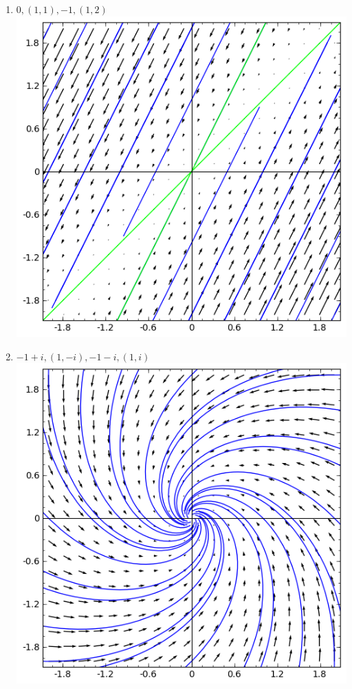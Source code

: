 {\begin{multicols}{2}
\begin{enumerate}
\begin{enumerate}
\item $0, (1,1),  -1, (1,2)$\\\includegraphics[width=\myvfwidth]{02-Applications/support/vfi}
\item $-1+i, (1,-i),  -1-i, (1,i)$\\\includegraphics[width=\myvfwidth]{02-Applications/support/vfj}
\end{enumerate}



\end{enumerate}
\end{multicols}}
